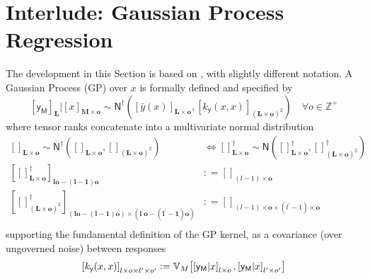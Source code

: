 \documentclass[preprint,12pt]{elsarticle}
\newcommand*{\M}[1]{\ensuremath{#1}\xspace}
\newcommand*{\x}{\times}
\newcommand*{\mi}[1]{\mathbf{#1}}
\newcommand*{\st}[1]{\mathbb{#1}}
\newcommand*{\rv}[1]{\mathsf{#1}}
\newcommand*{\te}[2][]{\left\lbrack{#2}\right\rbrack_{#1}}
\newcommand*{\deq}{\M{\mathrel{\mathop:}=}}
\newcommand*{\cov}[3][]{\ifthenelse{\equal{#1}{}}{\mathbb{V}_{#3}\!\left\lbrack{#2}\right\rbrack}{\mathbb{V}_{#3}\!\left\lbrack{#2,#1}\right\rbrack}}
\newcommand*{\gauss}[2]{\mathsf{N}\!\left({#1,#2}\right)}
\newcommand*{\gaussd}[2]{\mathsf{N}^{\dagger}\!\left({#1,#2}\right)}
\begin{document}
\section{Interlude: Gaussian Process Regression} \label{sec:GPR}
    The development in this Section is based on \cite{Alvarez.etal2011}, with slightly different notation. A Gaussian Process (GP) over $x$ is formally defined and specified by
    \begin{equation*}
        \te[\mi{L}]{\rv{y_M}} \big\vert \te[\mi{M}\x\mi{o}]{x} \sim 
        \gaussd{\te[\mi{L}\x\mi{o}]{\bar{y}(x)}}{\te[(\mi{L}\x\mi{o})^{2}]
        {k_{\rv{y}}(x,x)}} \quad \forall o \in \st{Z^{+}}
    \end{equation*}
    where tensor ranks concatenate into a multivariate normal distribution
    \begin{equation*}
        \begin{aligned}
            \te[\mi{L}\x\mi{o}]{} \sim \gaussd{\te[\mi{L}\x\mi{o}]{}}{\te[(\mi{L\x o})^{2}]{}}
            & \Longleftrightarrow
            \te[\mi{L}\x\mi{o}]{}^{\dagger} \sim \gauss{\te[\mi{L}\x\mi{o}]{}^{\dagger}}{\te[(\mi{L\x o})^{2}]{}^{\dagger}} \\
            \te[\mi{lo}-\mi{(l-1)o}]{\te[\mi{L}\x\mi{o}]{}^{\dagger}} 
            &\deq \te[(l-1)\x\mi{o}]{} \\
            \te[(\mi{lo}-(\mi{l-1})\mi{o}) \x (\mi{l^{\prime}o}-\mi{(l^{\prime}-1)o})]
            {\te[(\mi{L\x o})^{2}]{}^{\dagger}} 
            &\deq \te[(l-1)\x\mi{o} \x (l^{\prime}-1)\x\mi{o}]{} \\
        \end{aligned}
    \end{equation*}
    supporting the fundamental definition of the GP kernel, as a covariance (over ungoverned noise) between responses
    \begin{equation*}
        \te[l\x o\x l^{\prime}\x o^{\prime}]{k_{\rv{y}}(x,x)} 
        \deq \cov[{\te[l^{\prime}\x o^{\prime}]{\rv{y_M}\vert x}}]{\te[l\x o]{\rv{y_M}\vert x}}{M}
    \end{equation*}
\end{document}
